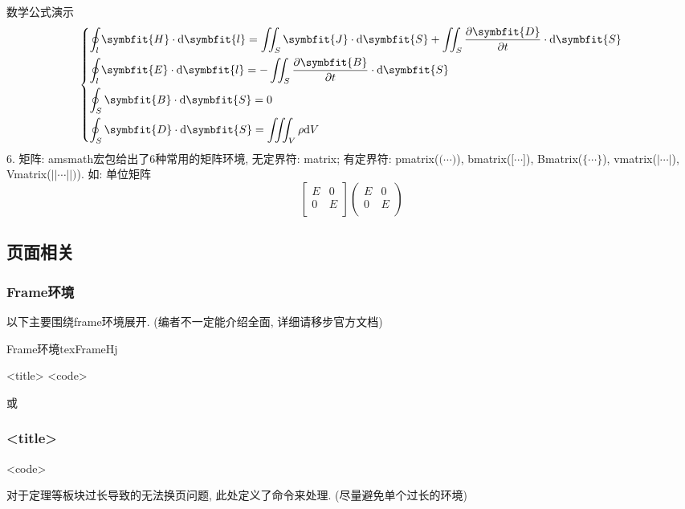 \documentclass[hyperref,UTF8,11pt,CJK]{beamer}
\begin{document}
\begin{frame}{数学公式演示}
\begin{equation}
\begin{dcases}
			\oint_l \symbfit{H} \cdot \mathrm{d}\symbfit{l} = \iint_S \symbfit{J} \cdot \mathrm{d}\symbfit{S} + \iint_S \dfrac{\partial\symbfit{D}}{\partial t} \cdot \mathrm{d}\symbfit{S} \\
			\oint_l \symbfit{E} \cdot \mathrm{d}\symbfit{l} = - \iint_S \dfrac{\partial\symbfit{B}}{\partial t} \cdot \mathrm{d}\symbfit{S} \\
			\oint_S \symbfit{B} \cdot \mathrm{d}\symbfit{S} = 0 \\
			\oint_S \symbfit{D} \cdot \mathrm{d}\symbfit{S} = \iiint_V \rho \mathrm{d}V
			\end{dcases}
		\end{equation}
	{\color{JXred}6. 矩阵:} amsmath宏包给出了6种常用的矩阵环境, 无定界符: {\color{JXred}matrix}; 有定界符: {\color{JXred}pmatrix}($\big(\cdots\big)$), {\color{JXred}bmatrix}($\big[\cdots\big]$), {\color{JXred}Bmatrix}($\bigl\{\cdots\bigr\}$), {\color{JXred}vmatrix}($|\cdots|$), {\color{JXred}Vmatrix}($||\cdots||)$).
	如: 单位矩阵
		\[
		\begin{bmatrix}
		E & 0 \\
		0 & E \\
		\end{bmatrix}
		\begin{pmatrix}
			E & 0 \\
			0 & E \\
		\end{pmatrix}
		\]
\end{frame}

\subsection{页面相关}
\cprotEnv\begin{frame}
	\frametitle{Frame环境}
	以下主要围绕frame环境展开. (编者不一定能介绍全面, 详细请移步官方文档)
	\begin{scushow}[comment={%
			\scriptsize%
			{\color{JXred}<keys>}\quad frame环境选项\\
			~~常用选项: {\color{BSblue}fragile}: 保护脆弱命令(如代码, 抄录环境需此项)\\
			~~{\color{BSblue}allowframebreaks(=?)}: 允许内容过多时自动切帧(括号中省略即自动判断). 注: 使用\texttt{pagebreak}或\texttt{framebreak}命令可实现手动位置切帧换页, 但会在一些时候失效(不知道为什么, 得看源码)\\
			~~{\color{BSblue}t}: 在页面顶部(默认居中)\\
			{\color{JXred}<title>}\quad 标题\\
		},%
		listing side comment]{Frame环境}{tex}{}{FrameHj}
			\begin{frame}[<keys>]{<title>}
				<code>
			\end{frame}
			或
			\begin{frame}[<keys>]
				\frametitle{<title>}
				<code>
			\end{frame}
	\end{scushow}
	对于定理等板块过长导致的无法换页问题, 此处定义了命令来处理. (尽量避免单个过长的环境)
\end{frame}
\end{document}
